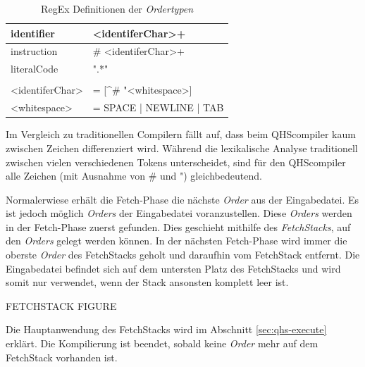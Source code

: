 \begin{table}[h]
    \centering
    \caption{RegEx Definitionen der \textit{Ordertypen}}
    \vspace{3mm} %
    
    \begin{tabular}{ll}
    \multicolumn{1}{l|}{identifier}        & \textless{}identiferChar\textgreater{}+                           \\ \hline
    \multicolumn{1}{l|}{instruction}       & \# \textless{}identiferChar\textgreater{}+                        \\ \hline
    \multicolumn{1}{l|}{literalCode}       & ".*"                                                              \\
                                           &                                                                   \\
    \textless{}identiferChar\textgreater{} & = {[}\textasciicircum{}\# "\textless{}whitespace\textgreater{}{]} \\
    \textless{}whitespace\textgreater{}    & = SPACE | NEWLINE | TAB
    
    \end{tabular}
\end{table}

Im Vergleich zu traditionellen Compilern fällt auf, dass beim QHScompiler kaum zwischen Zeichen differenziert wird. Während die lexikalische Analyse traditionell zwischen vielen verschiedenen Tokens unterscheidet,
sind für den QHScompiler alle Zeichen (mit Ausnahme von \# und ") gleichbedeutend.

Normalerwiese erhält die Fetch-Phase die nächste \textit{Order} aus der Eingabedatei. 
Es ist jedoch möglich \textit{Orders} der Eingabedatei voranzustellen. Diese \textit{Orders} werden in der Fetch-Phase zuerst gefunden. Dies geschieht mithilfe des \textit{FetchStacks}, auf den \textit{Orders} gelegt werden können.
In der nächsten Fetch-Phase wird immer die oberste \textit{Order} des FetchStacks geholt und daraufhin vom FetchStack entfernt.
Die Eingabedatei befindet sich auf dem untersten Platz des FetchStacks und wird somit nur verwendet, wenn der Stack ansonsten komplett leer ist.

FETCHSTACK FIGURE

%
%
Die Hauptanwendung des FetchStacks wird im Abschnitt \ref{sec:qhs-execute} erklärt.
Die Kompilierung ist beendet, sobald keine \textit{Order} mehr auf dem FetchStack vorhanden ist.

